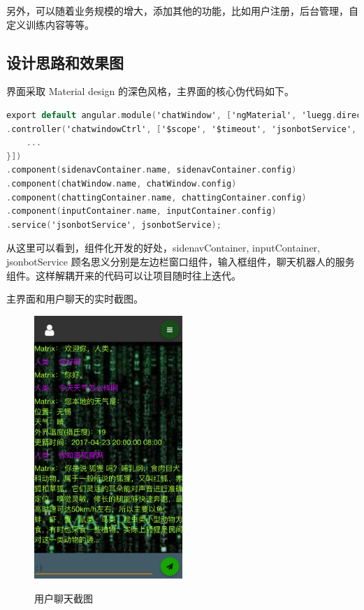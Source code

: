 \documentclass[bachelor,winfonts]{jnuthesis}
\begin{document}
另外，可以随着业务规模的增大，添加其他的功能，比如用户注册，后台管理，自定义训练内容等等。


\subsection{设计思路和效果图}

界面采取 Material design 的深色风格，主界面的核心伪代码如下。

\begin{lstlisting}[language=C]
export default angular.module('chatWindow', ['ngMaterial', 'luegg.directives'])
.controller('chatwindowCtrl', ['$scope', '$timeout', 'jsonbotService', function($scope, $timeout, jsonbotService) {
    ...
}])
.component(sidenavContainer.name, sidenavContainer.config)
.component(chatWindow.name, chatWindow.config)
.component(chattingContainer.name, chattingContainer.config)
.component(inputContainer.name, inputContainer.config)
.service('jsonbotService', jsonbotService);
\end{lstlisting}

从这里可以看到，组件化开发的好处，sidenavContainer, inputContainer, jsonbotService 顾名思义分别是左边栏窗口组件，输入框组件，聊天机器人的服务组件。这样解耦开来的代码可以让项目随时往上迭代。

主界面和用户聊天的实时截图。

\begin{figure}[H]
  \centering
  \includegraphics[width= 0.5\textwidth]{chat4.png}\\
  \caption{用户聊天截图}\label{fig:pic6}
\end{figure}
\end{document}
